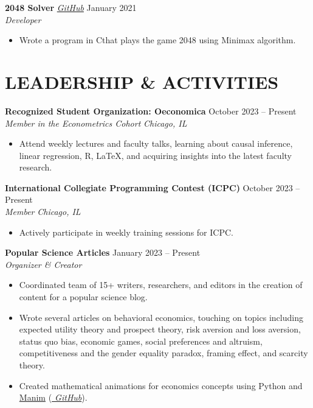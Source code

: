 \documentclass[letterpaper, 9pt]{extarticle}
\newcommand{\CPP}{C\nolinebreak\hspace{-.05em}\raisebox{.4ex}{\tiny\bf +}\nolinebreak\hspace{-.10em}\raisebox{.4ex}{\tiny\bf +}}
\begin{document}
\noindent
\textbf{2048 Solver} 
\emph{\href{https://github.com/AdenChen27/2048_solver}{\color{blue} GitHub}}
\hfill January 2021 \\
\textit{Developer} 
\begin{itemize}
    \item Wrote a program in \CPP \space that plays the game 2048 using Minimax algorithm. 
\end{itemize}

\section*{LEADERSHIP \& ACTIVITIES}


\noindent
\textbf{Recognized Student Organization: Oeconomica} 
\hfill October 2023 -- Present \\
\textit{Member in the Econometrics Cohort} \hfill \textit{Chicago, IL}
\begin{itemize}
    \item Attend weekly lectures and faculty talks, learning about causal inference, linear regression, R, \LaTeX, and acquiring insights into the latest faculty research.
\end{itemize}

\noindent
\textbf{International Collegiate Programming Contest (ICPC)} 
\hfill October 2023 -- Present \\
\textit{Member} \hfill \textit{Chicago, IL}
\begin{itemize}
    \item Actively participate in weekly training sessions for ICPC.
\end{itemize}


\noindent
\textbf{Popular Science Articles} 
\hfill January 2023 -- Present \\
\textit{Organizer \& Creator}
\begin{itemize}
    \item Coordinated team of 15+ writers, researchers, and editors in the creation of content for a popular science blog.
    \item Wrote several articles on behavioral economics, touching on topics including expected utility theory and prospect theory, risk aversion and loss aversion, status quo bias, economic games, social preferences and altruism, competitiveness and the gender equality paradox, framing effect, and scarcity theory. 
    \item Created mathematical animations for economics concepts using Python and \href{https://www.manim.community/}{Manim} (\emph{\href{https://github.com/AdenChen27/Econic}{\color{blue} GitHub}}).
\end{itemize}
\end{document}
